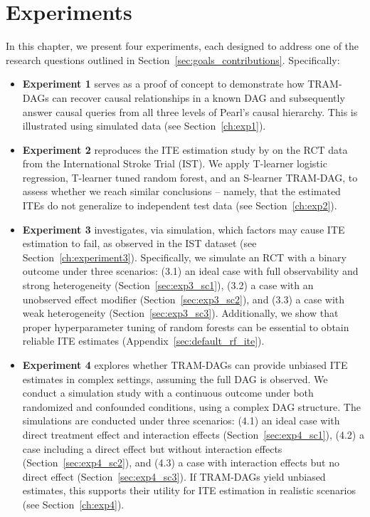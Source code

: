 

\chapter{Experiments} \label{ch:experiments}

In this chapter, we present four experiments, each designed to address one of the research questions outlined in Section~\ref{sec:goals_contributions}. Specifically:

\begin{itemize}

    \item \textbf{Experiment 1} serves as a proof of concept to demonstrate how TRAM-DAGs can recover causal relationships in a known DAG and subsequently answer causal queries from all three levels of Pearl's causal hierarchy. This is illustrated using simulated data (see Section~\ref{ch:exp1}).

    \item \textbf{Experiment 2} reproduces the ITE estimation study by \citet{chen2025} on the RCT data from the International Stroke Trial (IST). We apply T-learner logistic regression, T-learner tuned random forest, and an S-learner TRAM-DAG, to assess whether we reach similar conclusions -- namely, that the estimated ITEs do not generalize to independent test data (see Section~\ref{ch:exp2}).


     \item \textbf{Experiment 3} investigates, via simulation, which factors may cause ITE estimation to fail, as observed in the IST dataset (see Section~\ref{ch:experiment3}). Specifically, we simulate an RCT with a binary outcome under three scenarios: (3.1) an ideal case with full observability and strong heterogeneity (Section~\ref{sec:exp3_sc1}), (3.2) a case with an unobserved effect modifier (Section~\ref{sec:exp3_sc2}), and (3.3) a case with weak heterogeneity (Section~\ref{sec:exp3_sc3}). Additionally, we show that proper hyperparameter tuning of random forests can be essential to obtain reliable ITE estimates (Appendix~\ref{sec:default_rf_ite}).
     
    \item \textbf{Experiment 4} explores whether TRAM-DAGs can provide unbiased ITE estimates in complex settings, assuming the full DAG is observed. We conduct a simulation study with a continuous outcome under both randomized and confounded conditions, using a complex DAG structure. The simulations are conducted under three scenarios: (4.1) an ideal case with direct treatment effect and interaction effects (Section~\ref{sec:exp4_sc1}), (4.2) a case including a direct effect but without interaction effects (Section~\ref{sec:exp4_sc2}), and (4.3) a case with interaction effects but no direct effect (Section~\ref{sec:exp4_sc3}). If TRAM-DAGs yield unbiased estimates, this supports their utility for ITE estimation in realistic scenarios (see Section~\ref{ch:exp4}).

\end{itemize}


